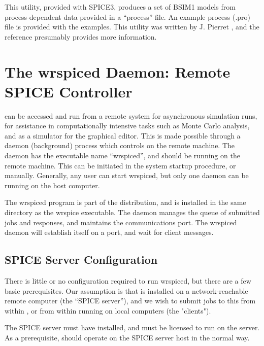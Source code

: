 
This utility, provided with SPICE3, produces a set of BSIM1 models
from process-dependent data provided in a ``process'' file.  An
example process ({\vt .pro}) file is provided with the {\WRspice}
examples.  This utility was written by J.  Pierret \cite{pierret},
and the reference presumably provides more information.


\section{The {\vt wrspiced} Daemon: Remote SPICE Controller}
\label{wrspiced}


{\WRspice} can be accessed and run from a remote system for
asynchronous simulation runs, for assistance in computationally
intensive tasks such as Monte Carlo analysis, and as a simulator for
the {\Xic} graphical editor.  This is made possible through a daemon
(background) process which controls {\WRspice} on the remote machine. 
The daemon has the executable name ``{\vt wrspiced}'', and should be
running on the remote machine.  This can be initiated in the system
startup procedure, or manually.  Generally, any user can start {\vt
wrspiced}, but only one daemon can be running on the host computer.

The {\vt wrspiced} program is part of the {\WRspice} distribution, and
is installed in the same directory as the {\vt wrspice} executable. 
The daemon manages the queue of submitted jobs and responses, and
maintains the communications port.  The {\vt wrspiced} daemon will
establish itself on a port, and wait for client messages.

\subsection{SPICE Server Configuration}

There is little or no configuration required to run {\vt wrspiced},
but there are a few basic prerequisites.  Our assumption is that
{\WRspice} is installed on a network-reachable remote computer (the
``SPICE server''), and we wish to submit jobs to this {\WRspice} from
within {\Xic}, or from within {\WRspice} running on local computers
(the "clients").

The SPICE server must have {\WRspice} installed, and {\WRspice} must
be licensed to run on the server.
As a prerequisite, {\WRspice} should operate on the
SPICE server host in the normal way.

